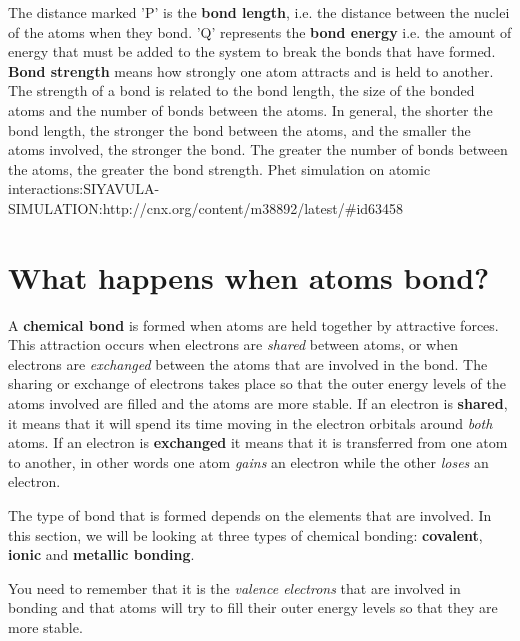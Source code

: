 The distance marked 'P' is the \textbf{bond length}, i.e. the distance between the nuclei of the atoms when they bond. 'Q' represents the \textbf{bond energy} i.e. the amount of energy that must be added to the system to break the bonds that have formed. \textbf{Bond strength} means how strongly one atom attracts and is held to another. The strength of a bond is related to the bond length, the size of the bonded atoms and the number of bonds between the atoms. In general, the shorter the bond length, the stronger the bond between the atoms, and the smaller the atoms involved, the stronger the bond. The greater the number of bonds between the atoms, the greater the bond strength.
Phet simulation on atomic interactions:SIYAVULA-SIMULATION:http://cnx.org/content/m38892/latest/#id63458





\section{What happens when atoms bond?}
\label{sec:bonding:what happens}

A \textbf{chemical bond} is formed when atoms are held together by attractive forces. This attraction occurs when electrons are \textit{shared} between atoms, or when electrons are \textit{exchanged} between the atoms that are involved in the bond. The sharing or exchange of electrons takes place so that the outer energy levels of the atoms involved are filled and the atoms are more stable. If an electron is \textbf{shared}, it means that it will spend its time moving in the electron orbitals around \textit{both} atoms. If an electron is \textbf{exchanged} it means that it is transferred from one atom to another, in other words one atom \textit{gains} an electron while the other \textit{loses} an electron.


The type of bond that is formed depends on the elements that are involved. In this section, we will be looking at three types of chemical bonding: \textbf{covalent}, \textbf{ionic} and \textbf{metallic bonding}.

You need to remember that it is the \textit{valence electrons} that are involved in bonding and that atoms will try to fill their outer energy levels so that they are more stable.


